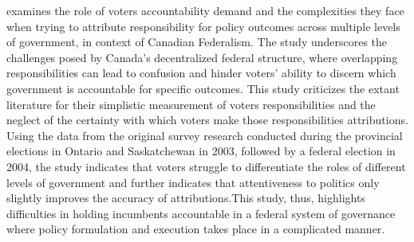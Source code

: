  examines the role of voters accountability demand and the complexities they face when trying to attribute responsibility for policy outcomes across multiple levels of government, in context of Canadian Federalism. The study underscores the challenges posed by Canada's decentralized federal structure, where overlapping responsibilities can lead to confusion and hinder voters' ability to discern which government is accountable for specific outcomes. This study criticizes the extant literature for their simplistic measurement of voters responsibilities and the neglect of the certainty with which voters make those responsibilities attributions. Using the data from the original survey research conducted during the provincial elections in Ontario and Saskatchewan in 2003, followed by a federal election in 2004, the study indicates that voters struggle to differentiate the roles of different levels of government and further indicates that attentiveness to politics only slightly improves the accuracy of attributions.This study, thus, highlights difficulties in holding incumbents accountable in a federal system of governance where policy formulation and execution takes place in a complicated manner. \\
